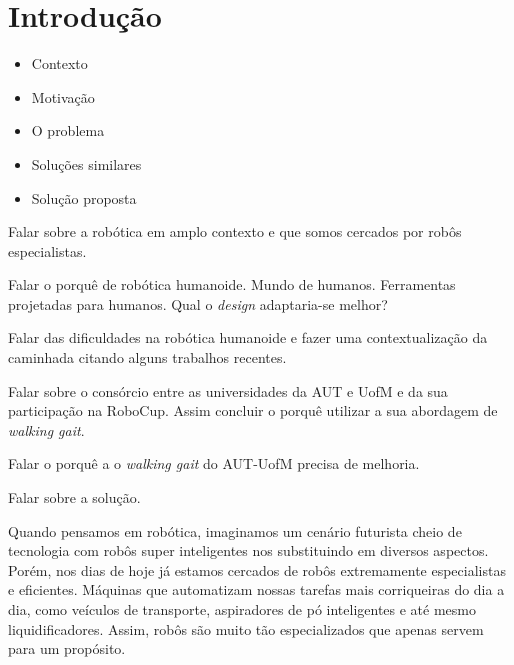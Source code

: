 \chapter{Introdução}

\begin{guide}
	\begin{itemize}
		\item Contexto
		\item Motivação
		\item O problema
		\item Soluções similares
		\item Solução proposta
	\end{itemize}
\end{guide}

\begin{guide}
	Falar sobre a robótica em amplo contexto e que somos cercados por robôs especialistas.

	Falar o porquê de robótica humanoide. Mundo de humanos. Ferramentas projetadas
	para humanos. Qual o \textit{design} adaptaria-se melhor?

	Falar das dificuldades na robótica humanoide e fazer uma contextualização
	da caminhada citando alguns trabalhos recentes.
\end{guide}

\begin{guide}
	Falar sobre o consórcio entre as universidades da AUT e UofM e da sua
	participação na RoboCup. Assim concluir o porquê utilizar a sua abordagem
	de \textit{walking gait}.
\end{guide}

\begin{guide}
	Falar o porquê a o \textit{walking gait} do AUT-UofM precisa de melhoria.
\end{guide}

\begin{guide}
	Falar sobre a solução.
\end{guide}


Quando pensamos em robótica, imaginamos um cenário futurista cheio de tecnologia
com robôs super inteligentes nos substituindo em diversos aspectos. Porém,
nos dias de hoje já estamos cercados de robôs extremamente especialistas e
eficientes. Máquinas que automatizam nossas tarefas mais corriqueiras do dia
a dia, como veículos de transporte, aspiradores de pó inteligentes e até
mesmo liquidificadores. Assim, robôs são muito tão especializados que apenas
servem para um propósito.

